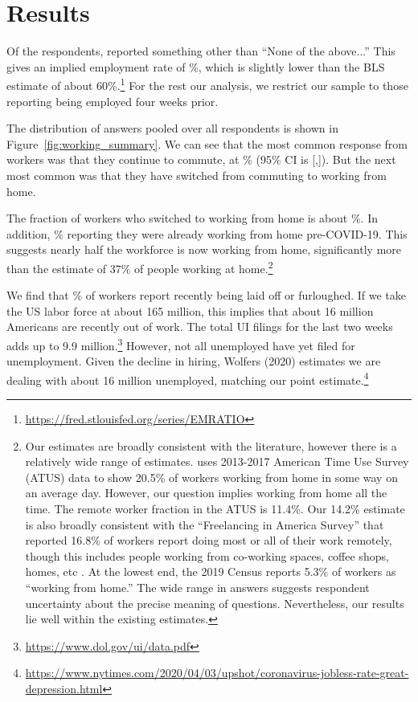 \documentclass[12pt]{article}
\begin{document}
\section{Results}

Of the respondents, \numObsWorking{} reported something other than ``None of the above...''
This gives an implied employment rate of \LFPRhat{}\%, which is slightly lower than the BLS estimate of about 60\%.\footnote{
  \url{https://fred.stlouisfed.org/series/EMRATIO}
}
For the rest our analysis, we restrict our sample to those reporting being employed four weeks prior.

The distribution of answers pooled over all respondents is shown in Figure~\ref{fig:working_summary}. 
We can see that the most common response from workers was that they continue to commute, at \stillCommute{}\% (95\% CI is [\stillCommuteLB,\stillCommuteUB]). 
But the next most common was that they have switched from commuting to working from home. 

The fraction of workers who switched to working from home is about \WFH{}\%.  In addition,  \alreadyWFH{}\% reporting they were already working from home pre-COVID-19.  This suggests nearly half the workforce is now working from home, significantly more than the \cite{dingel2020} estimate of 37\% of people working at home.\footnote{
Our estimates are broadly consistent with the literature, however there is a relatively wide range of estimates.
\cite{krantz2019did} uses 2013-2017 American Time Use Survey (ATUS) data to show 20.5\% of workers working from home in some way on an average day.
However, our question implies working from home all the time.
The remote worker fraction in the ATUS is 11.4\%.
Our 14.2\% estimate is also broadly consistent with the ``Freelancing in America Survey'' that reported 16.8\% of workers report doing most or all of their work remotely, though this includes people working from co-working spaces, coffee shops, homes, etc \citep{ozimek2020}.
At the lowest end, the 2019 Census reports 5.3\% of workers as ``working from home.''
The wide range in answers suggests respondent uncertainty about the precise meaning of questions. Nevertheless, our results lie well within the existing estimates.
}

We find that \LaidOff{}\% of workers report recently being laid off or furloughed. If we take the US labor force at about 165 million, this implies that about 16 million Americans are recently out of work.
The total UI filings for the last two weeks adds up to 9.9 million.\footnote{
  \url{https://www.dol.gov/ui/data.pdf}
}
However, not all unemployed have yet filed for unemployment.
Given the decline in hiring, Wolfers (2020) estimates we are dealing with about 16 million unemployed, matching our point estimate.\footnote{
  \url{https://www.nytimes.com/2020/04/03/upshot/coronavirus-jobless-rate-great-depression.html}
}
\end{document}
